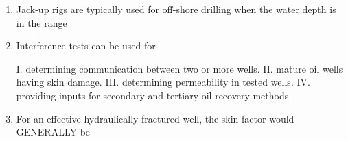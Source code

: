 \documentclass[journal]{IEEEtran}
\begin{document}
\begin{enumerate}
    \hfill{}
    
    \item Jack-up rigs are typically used for off-shore drilling when the water depth is in the range
    
    \begin{enumerate}  \end{enumerate}              
    
    \hfill{}
    
    \item Interference tests can be used for
    
    I. determining communication between two or more wells.
    II. mature oil wells having skin damage.
    III. determining permeability in tested wells.
    IV. providing inputs for secondary and tertiary oil recovery methods
    
    \begin{enumerate}  \end{enumerate}              
    
    \hfill{}
    
    \item For an effective hydraulically-fractured well, the skin factor would GENERALLY be
    
    \begin{enumerate}  \end{enumerate}              
    

\end{enumerate}
\end{document}

